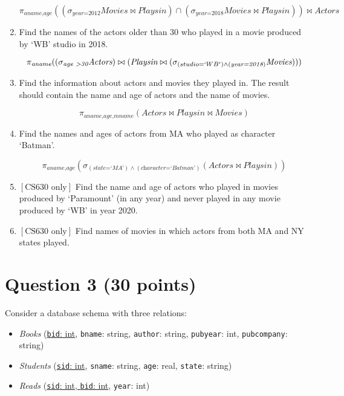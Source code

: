 \documentclass[letterpaper, 11pt]{article}
\begin{document}
\begin{enumerate}[label={\alph*}),leftmargin=*]
    \begin{tcolorbox}
    \[\pi_{\textit{aname,age}}((\sigma_{\textit{year=2012}}\textit{Movies} \bowtie \textit{Playsin}) \cap (\sigma_{\textit{year=2018}}\textit{Movies} \bowtie \textit{Playsin})) \bowtie \textit{Actors}\]
    \end{tcolorbox}    
    \item Find the names of the actors older than 30 who played in a movie produced by `WB' studio in 2018.
    \begin{tcolorbox}
    \[\pi_{\textit{aname}}((\sigma_{\textit{age \textgreater 30}}\textit{Actors}) \bowtie (\textit{Playsin} \bowtie (\sigma_{(studio=`WB') \wedge (\textit{year=2018})}\textit{Movies})))\]
    \end{tcolorbox}    
    \item Find the information about actors and movies they played in. The result should contain the name and age of actors and the name of movies.
    \begin{tcolorbox}
    \[\pi_{\textit{aname,age,mname}}(\textit{Actors} \bowtie \textit{Playsin} \bowtie \textit{Movies})\]
    \end{tcolorbox}    
    \item Find the names and ages of actors from MA who played as character `Batman'.
    \begin{tcolorbox}
    \[\pi_{\textit{aname,age}}(\sigma_{(\textit{state=`MA'})\wedge (\textit{character=`Batman'})}(\textit{Actors} \bowtie \textit{Playsin}))\]
    \end{tcolorbox}    
    \item $\left[\text{CS630 only}\right]$ Find the name and age of actors who played in movies produced by `Paramount' (in any year) and never played in any movie produced by `WB' in year 2020.
    \item $\left[\text{CS630 only}\right]$ Find names of movies in which actors from both MA and NY states played.
\end{enumerate}

\section*{Question 3 (30 points)}

Consider a database schema with three relations:
\begin{itemize}
    \item \textit{Books} (\ul{\texttt{bid}: int}, \texttt{bname}: string, \texttt{author}: string, \texttt{pubyear}: int, \texttt{pubcompany}: string)
    \item \textit{Students} (\ul{\texttt{sid}: int}, \texttt{sname}: string, \texttt{age}: real, \texttt{state}: string)
    \item \textit{Reads} (\ul{\texttt{sid}: int, \texttt{bid}: int}, \texttt{year}: int)
\end{itemize}
\end{document}
